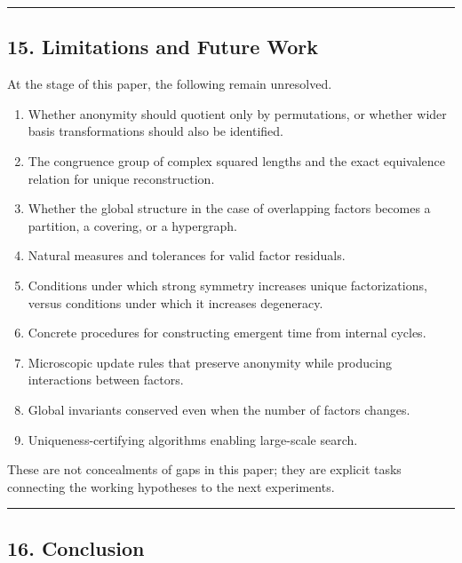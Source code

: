 \documentclass[
  a4paper,
]{article}
\providecommand{\tightlist}{%
  \setlength{\itemsep}{0pt}\setlength{\parskip}{0pt}}
\begin{document}
\begin{center}\rule{0.5\linewidth}{0.5pt}\end{center}

\subsection{15. Limitations and Future
Work}\label{limitations-and-future-work}

At the stage of this paper, the following remain unresolved.

\begin{enumerate}
\def\labelenumi{\arabic{enumi}.}
\tightlist
\item
  Whether anonymity should quotient only by permutations, or whether
  wider basis transformations should also be identified.
\item
  The congruence group of complex squared lengths and the exact
  equivalence relation for unique reconstruction.
\item
  Whether the global structure in the case of overlapping factors
  becomes a partition, a covering, or a hypergraph.
\item
  Natural measures and tolerances for valid factor residuals.
\item
  Conditions under which strong symmetry increases unique
  factorizations, versus conditions under which it increases degeneracy.
\item
  Concrete procedures for constructing emergent time from internal
  cycles.
\item
  Microscopic update rules that preserve anonymity while producing
  interactions between factors.
\item
  Global invariants conserved even when the number of factors changes.
\item
  Uniqueness-certifying algorithms enabling large-scale search.
\end{enumerate}

These are not concealments of gaps in this paper; they are explicit
tasks connecting the working hypotheses to the next experiments.

\begin{center}\rule{0.5\linewidth}{0.5pt}\end{center}

\subsection{16. Conclusion}\label{conclusion}
\end{document}
